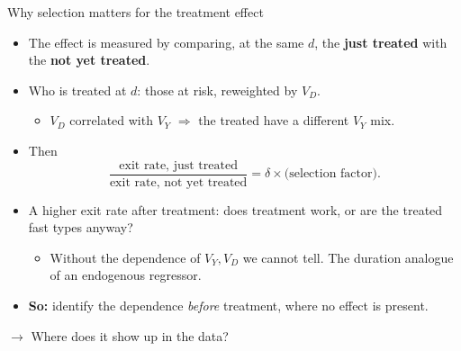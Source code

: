 \documentclass[aspectratio=169,10pt]{beamer}
\begin{document}
\begin{frame}{Why selection matters for the treatment effect}
  \begin{itemize}
    \item The effect is measured by comparing, at the same $d$, the \textbf{just treated} with the \textbf{not yet treated}.
    \item Who is treated at $d$: those at risk, reweighted by $V_D$.
      \begin{itemize}
        \item $V_D$ correlated with $V_Y$ $\Rightarrow$ the treated have a different $V_Y$ mix.
      \end{itemize}
    \item Then
      \[ \frac{\text{exit rate, just treated}}{\text{exit rate, not yet treated}}=\delta\times\text{(selection factor)}. \]
    \item A higher exit rate after treatment: does treatment work, or are the treated fast types anyway?
      \begin{itemize}
        \item Without the dependence of $V_Y,V_D$ we cannot tell. The duration analogue of an endogenous regressor.
      \end{itemize}
    \item \textbf{So:} identify the dependence \emph{before} treatment, where no effect is present.
  \end{itemize}
  \bigskip
  $\rightarrow$ Where does it show up in the data?
\end{frame}
\end{document}
